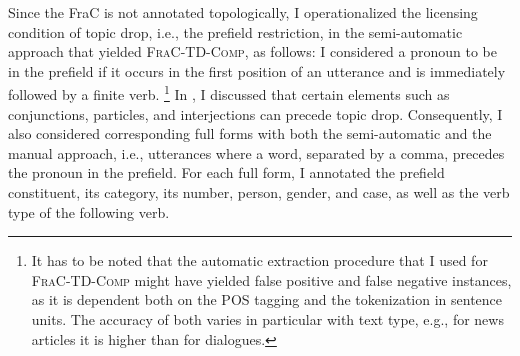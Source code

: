 \largerpage[-2]
Since the FraC is not annotated topologically, I operationalized the licensing condition of topic drop, i.e., the prefield restriction, in the semi-automatic approach that yielded \textsc{FraC-TD-Comp}, as follows:
I considered a pronoun to be in the prefield if it occurs in the first position of an utterance and is immediately followed by a finite verb.%
\footnote{It has to be noted that the automatic extraction procedure that I used for \textsc{FraC-TD-Comp} might have yielded false positive and false negative instances, as it is dependent both on the POS tagging and the tokenization in sentence units.
The accuracy of both varies in particular with text type, e.g., for news articles it is higher than for dialogues.}
In , I discussed that certain elements such as conjunctions,  particles, and interjections can precede topic drop.
Consequently, I also considered corresponding full forms with both the semi-automatic and the manual approach, i.e., utterances where a word, separated by a comma, precedes the pronoun in the prefield.
For each full form, I annotated the prefield constituent, its category, its number, person, gender, and case, as well as the verb type of the following verb.

